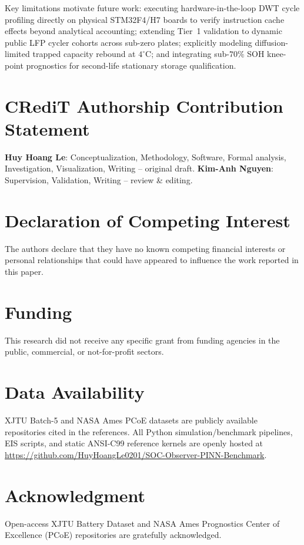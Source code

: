 \documentclass[11pt,a4paper]{article}
\begin{document}
Key limitations motivate future work: executing hardware-in-the-loop DWT cycle profiling directly on physical STM32F4/H7 boards to verify instruction cache effects beyond analytical accounting; extending Tier~1 validation to dynamic public LFP cycler cohorts across sub-zero plates; explicitly modeling diffusion-limited trapped capacity rebound at $4^\circ\text{C}$; and integrating sub-$70\%$ SOH knee-point prognostics for second-life stationary storage qualification.

\section*{CRediT Authorship Contribution Statement}
\textbf{Huy Hoang Le}: Conceptualization, Methodology, Software, Formal analysis, Investigation, Visualization, Writing -- original draft. \textbf{Kim-Anh Nguyen}: Supervision, Validation, Writing -- review \& editing.

\section*{Declaration of Competing Interest}
The authors declare that they have no known competing financial interests or personal relationships that could have appeared to influence the work reported in this paper.

\section*{Funding}
This research did not receive any specific grant from funding agencies in the public, commercial, or not-for-profit sectors.

\section*{Data Availability}
{\sloppy XJTU Batch-5 and NASA Ames PCoE datasets are publicly available repositories cited in the references. All Python simulation/benchmark pipelines, EIS scripts, and static ANSI-C99 reference kernels are openly hosted at \url{https://github.com/HuyHoangLe0201/SOC-Observer-PINN-Benchmark}.\par}

\section*{Acknowledgment}
{\sloppy Open-access XJTU Battery Dataset and NASA Ames Prognostics Center of Excellence (PCoE) repositories are gratefully acknowledged.\par}
\end{document}
